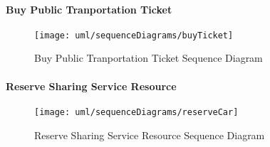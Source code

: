 	\vfill

\paragraph{Buy Public Tranportation Ticket}
	\begin{figure}[H]
		\centering
		\texttt{[image: uml/sequenceDiagrams/buyTicket]}
		\caption{Buy Public Tranportation Ticket Sequence Diagram}
	\end{figure}
	\vfill

\paragraph{Reserve Sharing Service Resource}
	\begin{figure}[H]
		\centering
		\texttt{[image: uml/sequenceDiagrams/reserveCar]}
		\caption{Reserve Sharing Service Resource Sequence Diagram}
	\end{figure}
	\vfill

